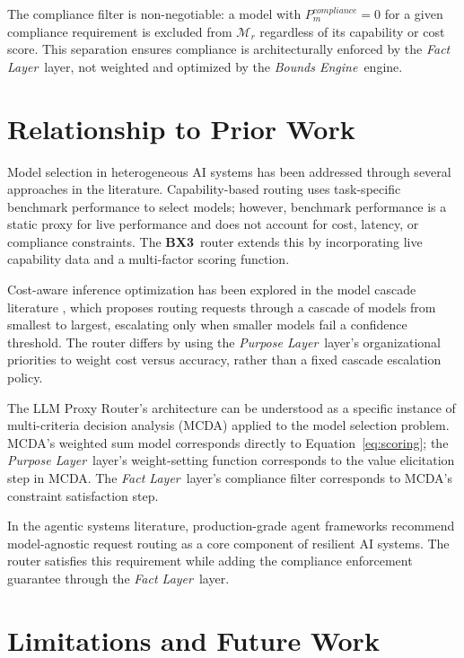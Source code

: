 \documentclass[12pt]{article}
\newcommand{\bxthree}{\textbf{BX3}}
\newcommand{\purpose}{\textit{Purpose Layer}}
\newcommand{\bounds}{\textit{Bounds Engine}}
\newcommand{\fact}{\textit{Fact Layer}}
\begin{document}
The compliance filter is non-negotiable: a model with $P_m^{compliance} = 0$ for a given compliance requirement is excluded from $\mathcal{M}_{r}$ regardless of its capability or cost score. This separation ensures compliance is architecturally enforced by the \fact\ layer, not weighted and optimized by the \bounds\ engine.

\section{Relationship to Prior Work}
\label{sec:prior}

Model selection in heterogeneous AI systems has been addressed through several approaches in the literature. Capability-based routing \cite{gpt3-2020} uses task-specific benchmark performance to select models; however, benchmark performance is a static proxy for live performance and does not account for cost, latency, or compliance constraints. The \bxthree\ router extends this by incorporating live capability data and a multi-factor scoring function.

Cost-aware inference optimization has been explored in the model cascade literature \cite{dinh2022cascade}, which proposes routing requests through a cascade of models from smallest to largest, escalating only when smaller models fail a confidence threshold. The router differs by using the \purpose\ layer's organizational priorities to weight cost versus accuracy, rather than a fixed cascade escalation policy.

The LLM Proxy Router's architecture can be understood as a specific instance of multi-criteria decision analysis (MCDA) \cite{keeney1976mcda} applied to the model selection problem. MCDA's weighted sum model corresponds directly to Equation~\ref{eq:scoring}; the \purpose\ layer's weight-setting function corresponds to the value elicitation step in MCDA. The \fact\ layer's compliance filter corresponds to MCDA's constraint satisfaction step.

In the agentic systems literature, production-grade agent frameworks \cite{alenezi2026} recommend model-agnostic request routing as a core component of resilient AI systems. The router satisfies this requirement while adding the compliance enforcement guarantee through the \fact\ layer.

\section{Limitations and Future Work}
\label{sec:limitations}
\end{document}

